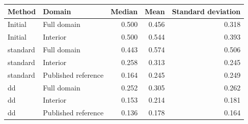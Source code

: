 \begin{tabular}{llrrr}\toprule Method & Domain & Median & Mean & Standard deviation\\\midrule
Initial & Full domain & 0.500 & 0.456 & 0.318\\
Initial & Interior & 0.500 & 0.544 & 0.393\\
standard & Full domain & 0.443 & 0.574 & 0.506\\
standard & Interior & 0.258 & 0.313 & 0.245\\
standard & Published reference & 0.164 & 0.245 & 0.249\\
dd & Full domain & 0.252 & 0.305 & 0.262\\
dd & Interior & 0.153 & 0.214 & 0.181\\
dd & Published reference & 0.136 & 0.178 & 0.164\\
\bottomrule\end{tabular}
